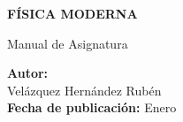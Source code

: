 \documentclass[12pt,a4paper]{article}
\begin{document}
\begin{titlepage}
\begin{center}
			\vspace{2.5cm}
			
			{\fontsize{24}{28}\selectfont\textbf{\textcolor{uteqGreen}{FÍSICA MODERNA}}}
			
			\vspace{1cm}
			{\Large Manual de Asignatura \the\year}
			
			\vspace{4cm}
			
			\begin{minipage}{0.8\textwidth}
				\begin{flushright}
					\textbf{Autor:} \\
					Velázquez Hernández Rubén \\
					\vspace{0.3cm}
					\textbf{Fecha de publicación:} Enero \the\year
				\end{flushright}
			\end{minipage}
			
			\vfill
			
			
		\end{center}
	\end{titlepage}
	
\end{document}
